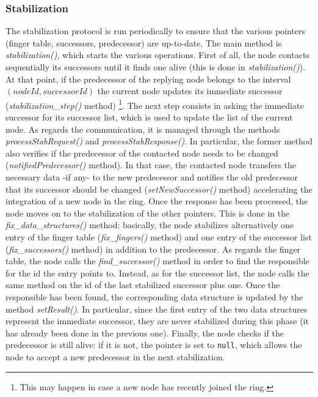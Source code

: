 \documentclass[11pt,twocolumn,letterpaper]{article}
\begin{document}
	\subsubsection{Stabilization}
	\label{subsubsec:stabilization}
	The stabilization protocol is run periodically to ensure that the various pointers (finger table, successors, predecessor) are up-to-date. The main method is \textit{stabilization()}, which starts the various operations. \newline
	First of all, the node contacts sequentially its successors until it finds one alive (this is done in \textit{stabilization()}). At that point, if the predecessor of the replying node belongs to the interval $(nodeId,successorId)$ the current node updates its immediate successor (\textit{stabilization\_step()} method) \footnote{This may happen in case a new node has recently joined the ring.}. The next step consists in asking the immediate successor for its successor list, which is used to update the list of the current node. As regards the communication, it is managed through the methods \textit{processStabRequest()} and \textit{processStabResponse()}. In particular, the former method also verifies if the predecessor of the contacted node needs to be changed  (\textit{notifiedPredecessor()} method). In that case, the contacted node transfers the necessary data -if any- to the new predecessor and notifies the old predecessor that its successor should be changed (\textit{setNewSuccessor()} method) accelerating the integration of a new node in the ring. \newline
	Once the response has been processed, the node moves on to the stabilization of the other pointers. This is done in the \textit{fix\_data\_structures()} method: basically, the node stabilizes alternatively one entry of the finger table (\textit{fix\_fingers()} method) and one entry of the successor list (\textit{fix\_successors()} method) in addition to the predecessor. As regards the finger table, the node calls the \textit{find\_successor()} method in order to find the responsible for the id the entry points to. Instead, as for the successor list, the node calls the same method on the id of the last stabilized successor plus one. Once the responsible has been found, the corresponding data structure is updated by the method \textit{setResult()}. In particular, since the first entry of the two data structures represent the immediate successor, they are never stabilized during this phase (it has already been done in the previous one). Finally, the node checks if the predecessor is still alive: if it is not, the pointer is set to \texttt{null}, which allows the node to accept a new predecessor in the next stabilization.
	
\end{document}
